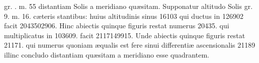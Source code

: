 \documentclass[11pt,a4paper]{article}
\begin{document}
gr. . m. 55 distantiam Solis a meridiano quæsitam. Supponatur
altitudo Solis gr. 9. m. 16. cæteris stantibus: huius altitudinis
sinus 16103 qui ductus in 126902 facit 2043502906. Hinc
abiectis quinque figuris restat numerus 20435. qui multiplicatus
in 103609. facit 2117149915. Unde abiectis quinque
figuris restat 21171. qui numerus quoniam æqualis est fere
sinui differentiæ ascensionalis 21189 illinc concludo distantiam
quæsitam a meridiano esse quadrantem.
\end{document}
